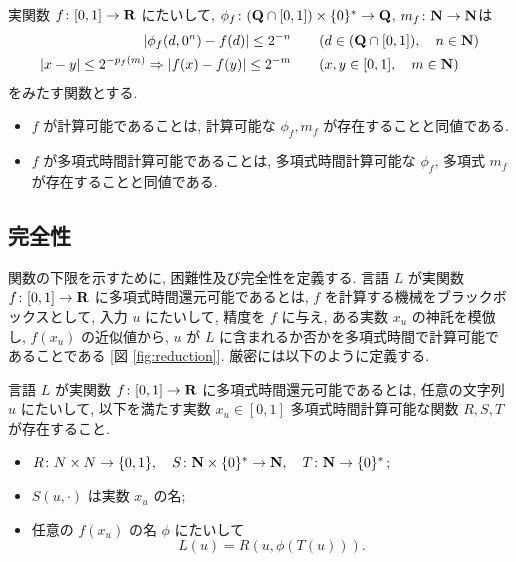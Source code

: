  \begin{lemma}
  \label{lem:type1representation}
  実関数 $f\colon [0,1] \to \mathbf R$ にたいして,
  $\phi_f\colon (\mathbf Q \cap [0, 1]) \times \{0\}^* \to \mathbf Q$, $m_f\colon \mathbf N \to \mathbf N$は
  \begin{align}
   |\phi_f(d, 0^n) - f(d)| \le 2^{-n} 
   &\qquad (d \in (\mathbf Q \cap [0,1]), \quad n \in \mathbf N)\\
   |x-y| \le 2^{-p_f(m)} \Rightarrow |f(x) - f(y)| \le 2^{-m}
   &\qquad (x, y \in [0, 1], \quad m \in \mathbf N)
  \end{align}
 をみたす関数とする.
  \begin{itemize}
   \item $f$ が計算可能であることは, 計算可能な $\phi_f, m_f$ が存在することと同値である. 
   \item $f$ が多項式時間計算可能であることは, 多項式時間計算可能な 
  $\phi_f$, 多項式 $m_f$ が存在することと同値である.
  \end{itemize} 
\end{lemma}

\subsection{完全性}

 関数の下限を示すために, 困難性及び完全性を定義する.
 言語 $L$ が実関数 $f\colon [0,1] \to \mathbf R$ に多項式時間還元可能であるとは,
 $f$ を計算する機械をブラックボックスとして, 入力 $u$ にたいして,
 精度を $f$ に与え, ある実数 $x_u$ の神託を模倣し, $f(x_u)$ の近似値から,
 $u$ が $L$ に含まれるか否かを多項式時間で計算可能であることである
 [図 \ref{fig:reduction}].
 厳密には以下のように定義する.

 \begin{definition}[多項式時間還元可能]
  言語 $L$ が実関数 $f\colon [0,1] \to \mathbf R$ に多項式時間還元可能であるとは, 
  任意の文字列 $u$ にたいして, 以下を満たす実数 $x_u \in [0,1]$
  多項式時間計算可能な関数 $R,S,T$ が存在すること.
  \begin{itemize}
   \item $R\colon N \times N \to \{0,1\}, \quad S\colon \mathbf N\times \{0\}^* \to \mathbf N, \quad
  T\colon \mathbf N \to \{0\}^*$;
   \item $S(u, \cdot)$ は実数 $x_u$ の名;
   \item 任意の $f(x_u)$ の名 $\phi$ にたいして
	 \[
	  L(u) = R(u, \phi(T(u))).
	 \]
  \end{itemize}
 \end{definition}

